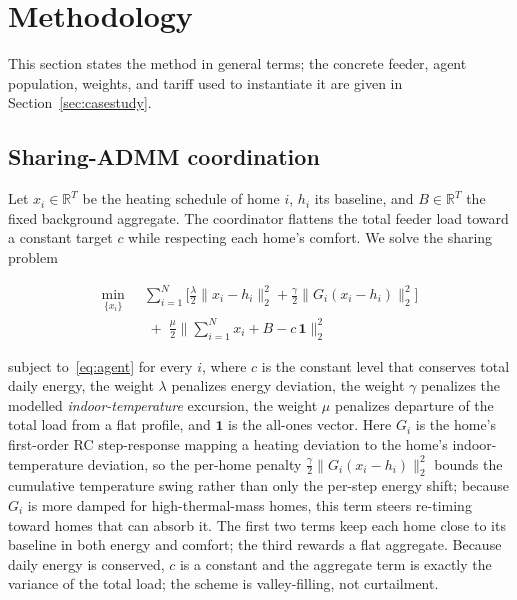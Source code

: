 \section{Methodology}
\label{sec:methodology}

This section states the method in general terms; the concrete feeder, agent
population, weights, and tariff used to instantiate it are given in
Section~\ref{sec:casestudy}.

\subsection{Sharing-ADMM coordination}
Let $x_i \in \mathbb{R}^{T}$ be the heating schedule of home $i$, $h_i$ its
baseline, and $B \in \mathbb{R}^{T}$ the fixed background aggregate. The
coordinator flattens the total feeder load toward a constant target $c$ while
respecting each home's comfort. We solve the sharing problem

\begin{equation}
\begin{aligned}
\min_{\{x_i\}}\;\; &\sum_{i=1}^{N} \Big[ \tfrac{\lambda}{2}\lVert x_i - h_i \rVert_2^2
+ \tfrac{\gamma}{2}\lVert G_i (x_i - h_i) \rVert_2^2 \Big] \\
&\;+\; \tfrac{\mu}{2}\Big\lVert \sum_{i=1}^{N} x_i + B - c\,\mathbf{1} \Big\rVert_2^2
\end{aligned}
\label{eq:sharing}
\end{equation}

subject to~\eqref{eq:agent} for every $i$, where $c$ is the constant level that
conserves total daily energy, the weight $\lambda$ penalizes energy deviation,
the weight $\gamma$ penalizes the modelled \emph{indoor-temperature} excursion,
the weight $\mu$ penalizes departure of the total load from a flat profile, and
$\mathbf{1}$ is the all-ones vector. Here $G_i$ is the home's first-order RC
step-response mapping a heating deviation to the home's indoor-temperature
deviation, so the per-home penalty $\frac{\gamma}{2}\lVert G_i (x_i - h_i)
\rVert_2^2$ bounds the cumulative temperature swing rather than only the per-step
energy shift; because $G_i$ is more damped for high-thermal-mass homes, this term
steers re-timing toward homes that can absorb it. The first two terms keep each
home close to its baseline in both energy and comfort; the third rewards a flat
aggregate. Because daily energy is conserved, $c$ is a constant and the
aggregate term is exactly the variance of the total load; the scheme is
valley-filling, not curtailment.

